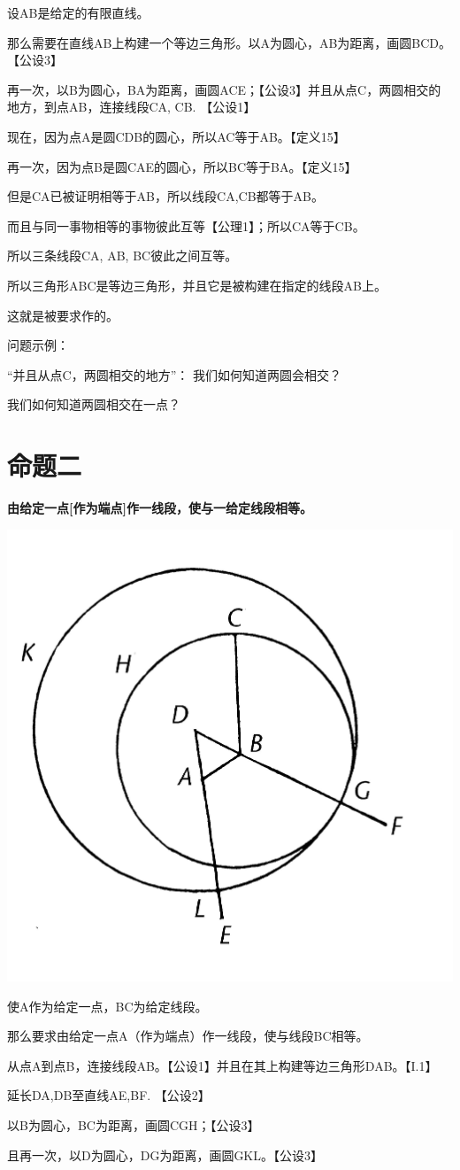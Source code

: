 \documentclass[
]{book}
\begin{document}
设AB是给定的有限直线。

那么需要在直线AB上构建一个等边三角形。以A为圆心，AB为距离，画圆BCD。【公设3】

再一次，以B为圆心，BA为距离，画圆ACE；【公设3】并且从点C，两圆相交的地方，到点AB，连接线段CA, CB. 【公设1】

现在，因为点A是圆CDB的圆心，所以AC等于AB。【定义15】

再一次，因为点B是圆CAE的圆心，所以BC等于BA。【定义15】

但是CA已被证明相等于AB，所以线段CA,CB都等于AB。

而且与同一事物相等的事物彼此互等【公理1】；所以CA等于CB。

所以三条线段CA, AB, BC彼此之间互等。

所以三角形ABC是等边三角形，并且它是被构建在指定的线段AB上。

这就是被要求作的。

问题示例：

``并且从点C，两圆相交的地方''： 我们如何知道两圆会相交？

我们如何知道两圆相交在一点？

\hypertarget{ux547dux9898ux4e8c}{%
\section{命题二}\label{ux547dux9898ux4e8c}}

\textbf{由给定一点{[}作为端点{]}作一线段，使与一给定线段相等。}

\includegraphics[width=0.3\linewidth]{./image/img447}

使A作为给定一点，BC为给定线段。

那么要求由给定一点A（作为端点）作一线段，使与线段BC相等。

从点A到点B，连接线段AB。【公设1】并且在其上构建等边三角形DAB。【I.1】

延长DA,DB至直线AE,BF. 【公设2】

以B为圆心，BC为距离，画圆CGH；【公设3】

且再一次，以D为圆心，DG为距离，画圆GKL。【公设3】
\end{document}
